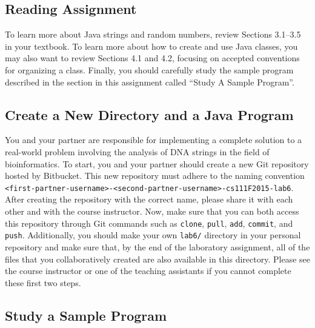 \vspace{-0.15in}
\subsection*{Reading Assignment}
\vspace{-0.05in}

To learn more about Java strings and random numbers, review Sections 3.1--3.5 in your textbook. To learn more about how
to create and use Java classes, you may also want to review Sections 4.1 and 4.2, focusing on accepted conventions for
organizing a class. Finally, you should carefully study the sample program described in the section in this assignment
called ``{Study A Sample Program}''.

\vspace{-0.05in}
\subsection*{Create a New Directory and a Java Program}
\vspace{-0.05in}

You and your partner are responsible for implementing a complete solution to a real-world problem involving the analysis
of DNA strings in the field of bioinformatics. To start, you and your partner should create a new Git repository hosted
by Bitbucket. This new repository must adhere to the naming convention {\tt
<first-partner-username>-<second-partner-username>-cs111F2015-lab6}. After creating the repository with the correct
name, please share it with each other and with the course instructor. Now, make sure that you can both access this
repository through Git commands such as {\tt clone}, {\tt pull}, {\tt add}, {\tt commit}, and {\tt push}. Additionally,
you should make your own {\tt lab6/} directory in your personal repository and make sure that, by the end of the
laboratory assignment, all of the files that you collaboratively created are also available in this directory. Please
see the course instructor or one of the teaching assistants if you cannot complete these first two steps.


\vspace{-0.05in}
\subsection*{Study a Sample Program}
\vspace{-0.05in}

